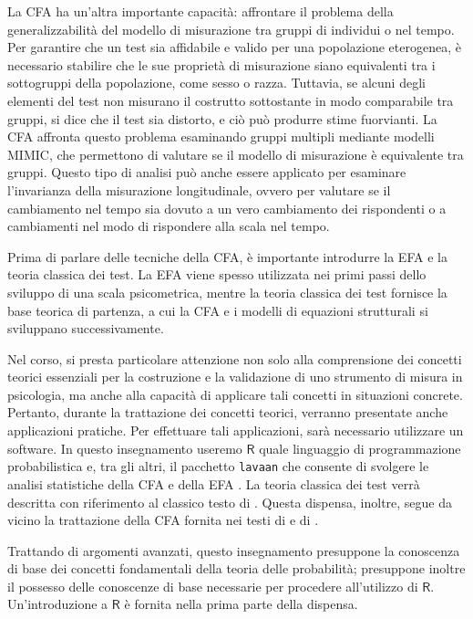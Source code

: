 \documentclass[
]{book}
\begin{document}
La CFA ha un'altra importante capacità: affrontare il problema della generalizzabilità del modello di misurazione tra gruppi di individui o nel tempo. Per garantire che un test sia affidabile e valido per una popolazione eterogenea, è necessario stabilire che le sue proprietà di misurazione siano equivalenti tra i sottogruppi della popolazione, come sesso o razza. Tuttavia, se alcuni degli elementi del test non misurano il costrutto sottostante in modo comparabile tra gruppi, si dice che il test sia distorto, e ciò può produrre stime fuorvianti. La CFA affronta questo problema esaminando gruppi multipli mediante modelli MIMIC, che permettono di valutare se il modello di misurazione è equivalente tra gruppi. Questo tipo di analisi può anche essere applicato per esaminare l'invarianza della misurazione longitudinale, ovvero per valutare se il cambiamento nel tempo sia dovuto a un vero cambiamento dei rispondenti o a cambiamenti nel modo di rispondere alla scala nel tempo.

Prima di parlare delle tecniche della CFA, è importante introdurre la EFA e la teoria classica dei test. La EFA viene spesso utilizzata nei primi passi dello sviluppo di una scala psicometrica, mentre la teoria classica dei test fornisce la base teorica di partenza, a cui la CFA e i modelli di equazioni strutturali si sviluppano successivamente.

Nel corso, si presta particolare attenzione non solo alla comprensione dei concetti teorici essenziali per la costruzione e la validazione di uno strumento di misura in psicologia, ma anche alla capacità di applicare tali concetti in situazioni concrete. Pertanto, durante la trattazione dei concetti teorici, verranno presentate anche applicazioni pratiche. Per effettuare tali applicazioni, sarà necessario utilizzare un software. In questo insegnamento useremo \(\textsf{R}\) \citep{rmanual} quale linguaggio di programmazione probabilistica e, tra gli altri, il pacchetto \texttt{lavaan} che consente di svolgere le analisi statistiche della CFA e della EFA \citep{beaujean2014latent}. La teoria classica dei test verrà descritta con riferimento al classico testo di \citet{lord1968statistical}. Questa dispensa, inoltre, segue da vicino la trattazione della CFA fornita nei testi di \citet{mcdonald2013test} e di \citet{brown2015confirmatory}.

Trattando di argomenti avanzati, questo insegnamento presuppone la conoscenza di base dei concetti fondamentali della teoria delle probabilità; presuppone inoltre il possesso delle conoscenze di base necessarie per procedere all'utilizzo di \(\textsf{R}\). Un'introduzione a \(\textsf{R}\) è fornita nella prima parte della dispensa.
\end{document}

